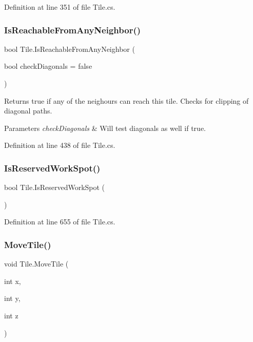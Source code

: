 Definition at line 351 of file Tile.\+cs.

\mbox{\label{class_tile_afe9cc96998331946edf8098b56c04dee}} 
\subsubsection{\texorpdfstring{Is\+Reachable\+From\+Any\+Neighbor()}{IsReachableFromAnyNeighbor()}}
{\footnotesize\ttfamily bool Tile.\+Is\+Reachable\+From\+Any\+Neighbor (\begin{DoxyParamCaption}\item[{bool}]{check\+Diagonals = {\ttfamily false} }\end{DoxyParamCaption})}



Returns true if any of the neighours can reach this tile. Checks for clipping of diagonal paths. 


\begin{DoxyParams}{Parameters}
{\em check\+Diagonals} & Will test diagonals as well if true.\\
\hline
\end{DoxyParams}


Definition at line 438 of file Tile.\+cs.

\mbox{\label{class_tile_adee7f47667dd691bc8a6ba2c382c2751}} 
\subsubsection{\texorpdfstring{Is\+Reserved\+Work\+Spot()}{IsReservedWorkSpot()}}
{\footnotesize\ttfamily bool Tile.\+Is\+Reserved\+Work\+Spot (\begin{DoxyParamCaption}{ }\end{DoxyParamCaption})}



Definition at line 655 of file Tile.\+cs.

\mbox{\label{class_tile_afe3b386af919d58d0c8f69ae50e2d96e}} 
\subsubsection{\texorpdfstring{Move\+Tile()}{MoveTile()}}
{\footnotesize\ttfamily void Tile.\+Move\+Tile (\begin{DoxyParamCaption}\item[{int}]{x,  }\item[{int}]{y,  }\item[{int}]{z }\end{DoxyParamCaption})}




